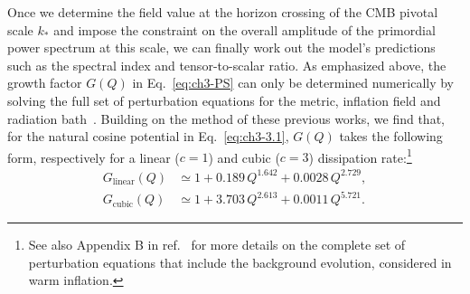 Once we determine the field value at the horizon crossing of the CMB pivotal scale $k_{*}$ and impose the constraint on the overall amplitude of the primordial power spectrum at this scale, we can finally work out the model's predictions such as the spectral index and tensor-to-scalar ratio. As emphasized above, the growth factor $G(Q)$ in Eq.~\ref{eq:ch3-PS} can only be determined numerically by solving the full set of perturbation equations for the metric, inflation field and radiation bath~\cite{Graham:2009bf,Bastero-Gil:2011rva,Ramos:2013nsa,Bastero-Gil:2014jsa}. Building on the method of these previous works, we find that, for the natural cosine potential in Eq.~\ref{eq:ch3-3.1}, $G(Q)$ takes the following form, respectively for a linear ($c=1$) and cubic ($c=3$) dissipation rate:\footnote{See also Appendix B in ref.~\cite{Das:2020xmh} for more details on the complete set of perturbation equations that include the background evolution, considered in warm inflation.}
\begin{align}
    G_{\mathrm{linear}}\left(Q\right) &\simeq 1+0.189\,Q^{1.642}+0.0028\,Q^{2.729}, \label{eq:ch3-G_1}\\
    G_{\mathrm{cubic}}\left(Q\right) &\simeq 1+3.703\,Q^{2.613}+0.0011\,Q^{5.721}. \label{eq:ch3-G_3}
\end{align}

